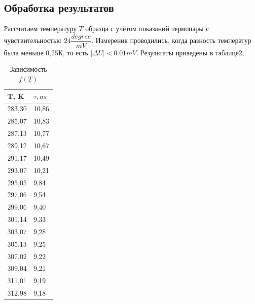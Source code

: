 \documentclass[a4paper]{article}
\begin{document}
    \subsection{Обработка результатов}
Рассчитаем температуру $T$ образца с учётом показаний термопары с чувствительностью $24\dfrac{degree}{mV}$. Измерения проводились, когда разность температур была меньше 0,25К, то есть $|\Delta U|< 0.01mV$.
Результаты приведены в таблице2, 
\begin{table}[H]
    \centering
    \caption{Зависимость $f(T)$}
    \begin{tabular}{|l|l|}
    \hline
        T, K & $\tau, us$ \\ \hline
        283,30 & 10,86 \\ \hline
        285,07 & 10,83 \\ \hline
        287,13 & 10,77 \\ \hline
        289,12 & 10,67 \\ \hline
        291,17 & 10,49 \\ \hline
        293,07 & 10,21 \\ \hline
        295,05 & 9,84 \\ \hline
        297,06 & 9,54 \\ \hline
        299,06 & 9,40 \\ \hline
        301,14 & 9,33 \\ \hline
        303,07 & 9,28 \\ \hline
        305,13 & 9,25 \\ \hline
        307,02 & 9,22 \\ \hline
        309,04 & 9,21 \\ \hline
        311,01 & 9,19 \\ \hline
        312,98 & 9,18 \\ \hline
    \end{tabular}
\end{table}
\end{document}
